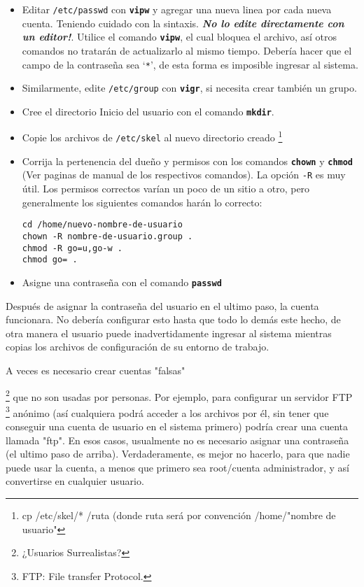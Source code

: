 \documentclass[12pt]{article}
\begin{document}
\begin{itemize}
	
	\item{ Editar \texttt{/etc/passwd} con
	\texttt{\textbf{vipw}} y agregar una nueva linea por cada nueva cuenta.
	Teniendo cuidado con la sintaxis.  \textit{\bf No lo edite directamente
	con un editor!}. Utilice el comando \texttt{\textbf{vipw}}, el cual bloquea el
	archivo, así otros comandos no tratarán de actualizarlo al mismo tiempo.
	Debería hacer que el campo de la contraseña sea `\texttt{*}',
	de esta forma es imposible ingresar al sistema.}

	\item{ Similarmente, edite \texttt{/etc/group} con
	\texttt{\textbf{vigr}}, si necesita crear también un
	grupo.} \item{ Cree el directorio Inicio del
	usuario con el comando \texttt{\textbf{mkdir}}.}
	\item{ Copie los archivos de \texttt{/etc/skel} al
	nuevo directorio creado 
	\footnote{cp /etc/skel/* /ruta
(donde ruta será por convención /home/"nombre de usuario"}}
	\item{ Corrija
	la pertenencia del dueño y permisos con los comandos
	\texttt{\textbf{chown}} y \texttt{\textbf{chmod}} (Ver paginas de
	manual de los respectivos comandos). La opción \texttt{-R} es
	muy útil. Los permisos correctos varían un poco de un sitio a otro, pero
	generalmente los siguientes comandos harán lo correcto:


\begin{verbatim}
cd /home/nuevo-nombre-de-usuario
chown -R nombre-de-usuario.group .  
chmod -R go=u,go-w .  
chmod go= .
\end{verbatim}


	}
	
	\item{ Asigne una contraseña con el comando
	\texttt{\textbf{passwd}}}

\end{itemize} 
	
	Después de asignar la contraseña del usuario en el ultimo paso, la
	cuenta funcionara. No debería configurar esto hasta que todo lo demás
	este hecho, de otra manera el usuario puede inadvertidamente ingresar al
	sistema mientras copias los archivos de configuración de su entorno de
	trabajo.

A veces es necesario crear cuentas "falsas"
		
		\footnote{¿Usuarios Surrealistas?} que no son
		usadas por personas. Por ejemplo, para configurar un servidor
		FTP
		\footnote{FTP: File
		transfer Protocol.} anónimo (así cualquiera podrá acceder a los archivos por
		él, sin tener que conseguir una cuenta de usuario en el sistema
		primero) podría crear una cuenta llamada "ftp". En esos casos,
		usualmente no es necesario asignar una contraseña (el ultimo
		paso de arriba).  Verdaderamente, es mejor no hacerlo, para que
		nadie puede usar la cuenta, a menos que primero sea root/cuenta
		administrador, y así convertirse en cualquier usuario.
\end{document}

